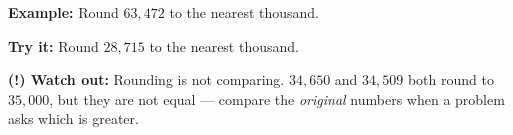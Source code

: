 \documentclass[12pt]{article}
\begin{document}
\begin{examplebox}
\textbf{Example:} \quad Round $63{,}472$ to the nearest thousand.
\end{examplebox}

\begin{tryitbox}
\textbf{Try it:} \quad Round $28{,}715$ to the nearest thousand.\\[2pt]
\end{tryitbox}

\begin{watchoutbox}
\textbf{(!) Watch out:} Rounding is not comparing. $34{,}650$ and $34{,}509$ both round to
$35{,}000$, but they are not equal --- compare the \emph{original} numbers when a problem
asks which is greater.
\end{watchoutbox}
\end{document}
